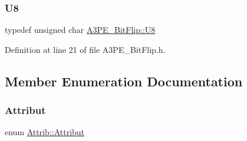 \subsubsection{\texorpdfstring{U8}{U8}}
{\footnotesize\ttfamily typedef unsigned char \hyperlink{classA3PE__BitFlip_ac561e6bbd8d4101ecc32016314a07581}{A3\+P\+E\+\_\+\+Bit\+Flip\+::\+U8}}



Definition at line 21 of file A3\+P\+E\+\_\+\+Bit\+Flip.\+h.



\subsection{Member Enumeration Documentation}
\mbox{\label{classAttrib_a69e171d7cc6417835a5a306d3c764235}} 
\subsubsection{\texorpdfstring{Attribut}{Attribut}}
{\footnotesize\ttfamily enum \hyperlink{classAttrib_a69e171d7cc6417835a5a306d3c764235}{Attrib\+::\+Attribut}\hspace{0.3cm}{\ttfamily [inherited]}}

